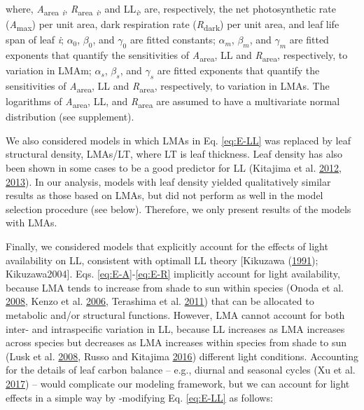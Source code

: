 \documentclass[
  12pt,
]{article}
\begin{document}
where, \emph{A}\textsubscript{area} \textsubscript{\emph{i}}, \emph{R}\textsubscript{area} \textsubscript{\emph{i}}, and LL\textsubscript{\emph{i}}, are, respectively, the net photosynthetic rate (\emph{A}\textsubscript{max}) per unit area, dark respiration rate (\emph{R}\textsubscript{dark}) per unit area, and leaf life span of leaf \emph{i}; \(\alpha_0\), \(\beta_0\), and \(\gamma_0\) are fitted constants; \(\alpha_m\), \(\beta_m\), and \(\gamma_m\) are fitted exponents that quantify the sensitivities of \emph{A}\textsubscript{area}, LL and \emph{R}\textsubscript{area}, respectively, to variation in LMAm; \(\alpha_s\), \(\beta_s\), and \(\gamma_s\) are fitted exponents that quantify the sensitivities of \emph{A}\textsubscript{area}, LL and \emph{R}\textsubscript{area}, respectively, to variation in LMAs.
The logarithms of \emph{A}\textsubscript{area}, LL, and \emph{R}\textsubscript{area} are assumed to have a multivariate normal distribution (see supplement).

We also considered models in which LMAs in Eq. \eqref{eq:E-LL} was replaced by leaf structural density, LMAs/LT, where LT is leaf thickness.
Leaf density has also been shown in some cases to be a good predictor for LL (Kitajima et al. \protect\hyperlink{ref-Kitajima2012}{2012}, \protect\hyperlink{ref-Kitajima2013}{2013}).
In our analysis, models with leaf density yielded qualitatively similar results as those based on LMAs, but did not perform as well in the model selection procedure (see below).
Therefore, we only present results of the models with LMAs.

Finally, we considered models that explicitly account for the effects of light availability on LL, consistent with optimall LL theory {[}Kikuzawa (\protect\hyperlink{ref-Kikuzawa1991}{1991}); Kikuzawa2004{]}.
Eqs. \eqref{eq:E-A}-\eqref{eq:E-R} implicitly account for light availability, because LMA tends to increase from shade to sun within species (Onoda et al. \protect\hyperlink{ref-Onoda2008}{2008}, Kenzo et al. \protect\hyperlink{ref-Kenzo2006}{2006}, Terashima et al. \protect\hyperlink{ref-Terashima2011}{2011}) that can be allocated to metabolic and/or structural functions.
However, LMA cannot account for both inter- and intraspecific variation in LL, because LL increases as LMA increases across species but decreases as LMA increases within species from shade to sun (Lusk et al. \protect\hyperlink{ref-Lusk2008}{2008}, Russo and Kitajima \protect\hyperlink{ref-Russo2016}{2016}) different light conditions.
Accounting for the details of leaf carbon balance -- e.g., diurnal and seasonal cycles (Xu et al. \protect\hyperlink{ref-Xu2017}{2017}) -- would complicate our modeling framework, but we can account for light effects in a simple way by -modifying Eq. \eqref{eq:E-LL} as follows:
\end{document}
